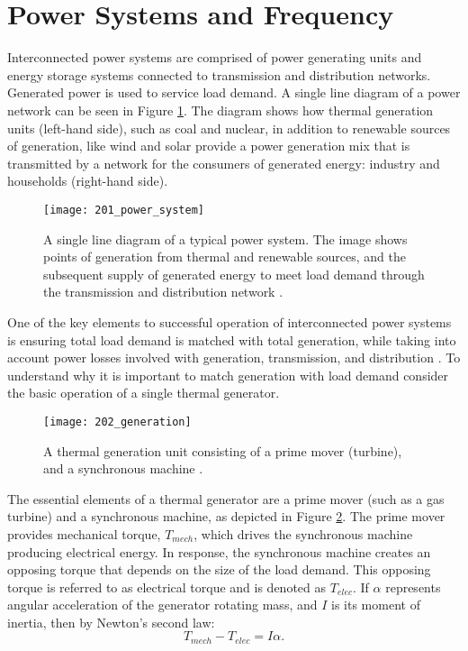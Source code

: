 \section{Power Systems and Frequency}
Interconnected power systems are comprised of power generating units and energy storage systems connected to transmission and distribution networks. Generated power is used to service load demand. A single line diagram of a power network can be seen in Figure \ref{fig:201_power_system}. The diagram shows how thermal generation units (left-hand side), such as coal and nuclear, in addition to renewable sources of generation, like wind and solar provide a power generation mix that is transmitted by a network for the consumers of generated energy: industry and households (right-hand side).
\begin{figure}[ht]
	\centering
	\texttt{[image: 201\_power\_system]}
	\caption[High level overview of a power network]{A single line diagram of a typical power system. The image shows points of generation from thermal and renewable sources, and the subsequent supply of generated energy to meet load demand through the transmission and distribution network \cite{Glavic2019}.}
	\label{fig:201_power_system}
\end{figure}

One of the key elements to successful operation of interconnected power systems is ensuring total load demand is matched with total generation, while taking into account power losses involved with generation, transmission, and distribution \cite{Wood2013}. To understand why it is important to match generation with load demand consider the basic operation of a single thermal generator. 
\begin{figure}[h]
	\centering
	\texttt{[image: 202\_generation]}
	\caption[Turbine generator model]{A thermal generation unit consisting of a prime mover (turbine), and a synchronous machine \cite{Wood2013}.}
	\label{fig:202_generation}
\end{figure}

The essential elements of a thermal generator are a prime mover (such as a gas turbine) and a synchronous machine, as depicted in Figure \ref{fig:202_generation}. The prime mover provides mechanical torque, $T_{mech}$, which drives the synchronous machine producing electrical energy. In response, the synchronous machine creates an opposing torque that depends on the size of the load demand. This opposing torque is referred to as electrical torque and is denoted as $T_{elec}$. If $\alpha$ represents angular acceleration of the generator rotating mass, and $I$ is its moment of inertia, then by Newton's second law:
\begin{equation}
	T_{mech} - T_{elec} = I \alpha. \label{eq:201}
\end{equation}

